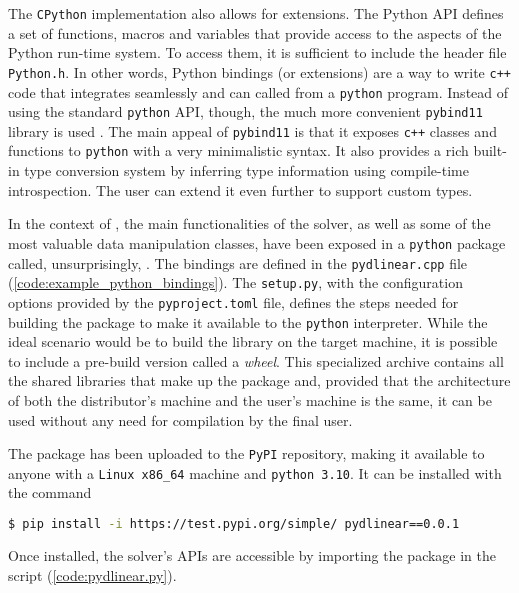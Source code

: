 The \texttt{CPython} implementation also allows for extensions.
The Python API defines a set of functions, macros and variables that provide access to the aspects of the Python run-time system.
To access them, it is sufficient to include the header file \texttt{Python.h}.
In other words, Python bindings (or extensions) are a way to write \texttt{c++} code that integrates seamlessly and can called from a \texttt{python} program.
Instead of using the standard \texttt{python} API, though, the much more convenient \texttt{pybind11} library is used \cite{man:pybind11}.
The main appeal of \texttt{pybind11} is that it exposes \texttt{c++} classes and functions to \texttt{python} with a very minimalistic syntax.
It also provides a rich built-in type conversion system by inferring type information using compile-time introspection.
The user can extend it even further to support custom types.

In the context of \dlinear, the main functionalities of the solver, as well as some of the most valuable data manipulation classes, have been exposed in a \texttt{python} package called, unsurprisingly, \pydlinear.
The bindings are defined in the \texttt{pydlinear.cpp} file (\autoref{code:example_python_bindings}).
The \texttt{setup.py}, with the configuration options provided by the \texttt{pyproject.toml} file, defines the steps needed for building the package to make it available to the \texttt{python} interpreter.
While the ideal scenario would be to build the \dlinear library on the target machine, it is possible to include a pre-build version called a \textit{wheel}.
This specialized archive contains all the shared libraries that make up the package and, provided that the architecture of both the distributor's machine and the user's machine is the same, it can be used without any need for compilation by the final user.



The package has been uploaded to the \texttt{PyPI} repository, making it available to anyone with a \texttt{Linux x86\_64} machine and \texttt{python 3.10}.
It can be installed with the command

\begin{lstlisting}[language=bash,frame=single,showstringspaces=false]
$ pip install -i https://test.pypi.org/simple/ pydlinear==0.0.1
\end{lstlisting}
Once installed, the solver's APIs are accessible by importing the \pydlinear package in the script (\autoref{code:pydlinear.py}).

